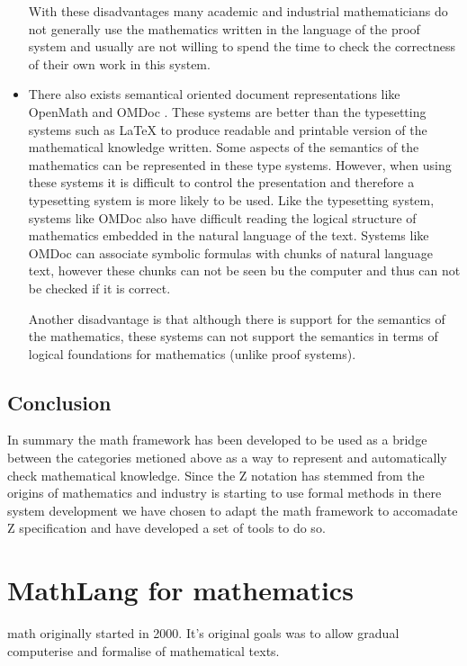 \begin{itemize}
With these disadvantages many academic and industrial mathematicians do not generally use the mathematics written in the language of the proof system and usually are not willing to spend the time to check the correctness of their own work in this system.

\item There also exists semantical oriented document representations like OpenMath \cite{openmath} and OMDoc \cite{omdoc}. These systems are better than the typesetting systems such as \LaTeX{} to produce readable and printable version of the mathematical knowledge written. Some aspects of the semantics of the mathematics can be represented in these type systems. However, when using these systems it is difficult to control the presentation and therefore a typesetting system is more likely to be used. Like the typesetting system, systems like OMDoc also have difficult reading the logical structure of mathematics embedded in the natural language of the text. Systems like OMDoc can associate symbolic formulas with chunks of natural language text, however these chunks can not be seen bu the computer and thus can not be checked if it is correct.

Another disadvantage is that although there is support for the semantics of the mathematics, these systems can not support the semantics in terms of logical foundations for mathematics (unlike proof systems).
\end{itemize}


\subsection{Conclusion}

In summary the \gls{math} framework has been developed to be used as a bridge between the categories metioned above as a way to represent and automatically check mathematical knowledge. Since the Z notation has stemmed from the origins of mathematics and industry is starting to use formal methods in there system development we have chosen to adapt the \gls{math} framework to accomadate Z specification and have developed a set of tools to do so.

\section{MathLang for mathematics}
\label{sec:mathlangbackground}

\Gls{math} originally started in 2000. It's original goals was to allow gradual \gls{computerise} and \gls{formalise} of mathematical texts.


